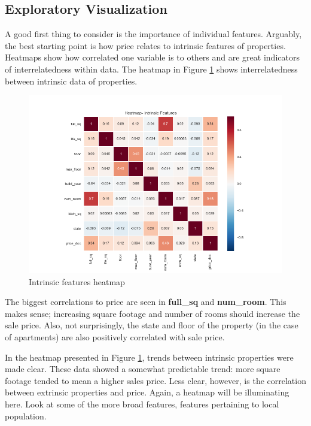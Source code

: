 \documentclass[12pt]{article}
\theoremstyle{plain} %
\theoremstyle{definition} %
\theoremstyle{remark} %
\begin{document}
\subsection*{Exploratory Visualization}
\indent \par A good first thing to consider is the importance of individual features. Arguably, the best starting point is how price relates to intrinsic features of properties.  Heatmaps show how correlated one variable is to others and are great indicators of interrelatedness within data.  The heatmap in Figure \ref{fig:seven} shows interrelatedness between intrinsic data of properties.

\begin{figure}[h!]
\begin{center}
\includegraphics[width=15cm]{./output_images/intrinsic_heatmap.png}
\caption{Intrinsic features heatmap}
\label{fig:seven}
\end{center}
\end{figure}

\par The biggest correlations to price are seen in \textbf{full\_sq} and \textbf{num\_room}.  This makes sense; increasing square footage and number of rooms should increase the sale price.  Also, not surprisingly, the state and floor of the property (in the case of apartments) are also positively correlated with sale price.

\par In the heatmap presented in Figure \ref{fig:seven}, trends between intrinsic properties were made clear.  These data showed a somewhat predictable trend: more square footage tended to mean a higher sales price.  Less clear, however, is the correlation between extrinsic properties and price.  Again, a heatmap will be illuminating here.  Look at some of the more broad features, features pertaining to local population.
\end{document}
